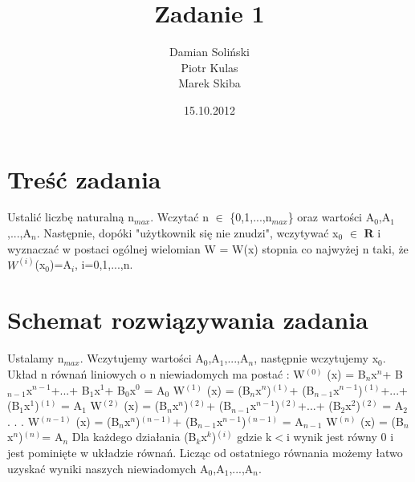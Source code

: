 \documentclass[11pt]{article}
\title{\textbf{Zadanie 1}}
\author{Damian Soliński\\
		Piotr Kulas\\
		Marek Skiba}
\date{15.10.2012}
\begin{document}
\maketitle

\section{Treść zadania}

Ustalić liczbę naturalną n$_{max}$. Wczytać n $\in$ \{0,1,...,n$_{max}$\} oraz wartości A$_{0}$,A$_{1}$,...,A$_{n}$. Następnie, dopóki "użytkownik się nie znudzi", wczytywać x$_{0}$ $\in$ $\mathbf{R}$ i wyznaczać w postaci ogólnej wielomian W = W(x) stopnia co najwyżej n taki, że $W^{(i)}$(x$_{0}$)=A$_{i}$,  i=0,1,...,n.  
\section{Schemat rozwiązywania zadania}
Ustalamy n$_{max}$. Wczytujemy wartości A$_{0}$,A$_{1}$,...,A$_{n}$, następnie wczytujemy x$_{0}$. Układ n równań liniowych o n niewiadomych ma postać :  \newline
W$^{(0)}$ (x) = B$_{n}$x$^{n}$+ B$_{n-1}$x$^{n-1}$+...+ B$_{1}$x$^{1}$+ B$_{0}$x$^{0}$ = A$_{0}$ \newline
W$^{(1)}$ (x) = (B$_{n}$x$^{n}$)$^{(1)}$+ (B$_{n-1}$x$^{n-1}$)$^{(1)}$+...+ (B$_{1}$x$^{1}$)$^{(1)}$ = A$_{1}$ \newline
W$^{(2)}$ (x) = (B$_{n}$x$^{n}$)$^{(2)}$+ (B$_{n-1}$x$^{n-1}$)$^{(2)}$+...+ (B$_{2}$x$^{2}$)$^{(2)}$ = A$_{2}$ \newline
. \newline . \newline . \newline
W$^{(n-1)}$ (x) = (B$_{n}$x$^{n}$)$^{(n-1)}$+ (B$_{n-1}$x$^{n-1}$)$^{(n-1)}$ = A$_{n-1}$ \newline
W$^{(n)}$ (x) = (B$_{n}$x$^{n}$)$^{(n)}$= A$_{n}$ \newline
\newline Dla każdego działania (B$_{k}$x$^{k}$)$^{(i)}$ gdzie k$<$i wynik jest równy 0 i jest pominięte w układzie równań. \newline Licząc od ostatniego równania możemy łatwo uzyskać wyniki naszych niewiadomych A$_{0}$,A$_{1}$,...,A$_{n}$.
\end{document}

